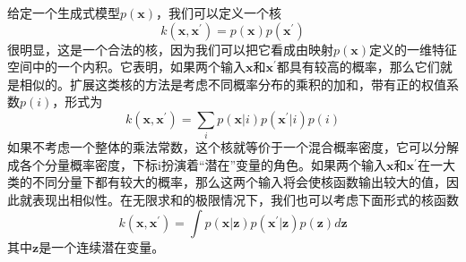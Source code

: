 给定一个生成式模型$p(\boldsymbol{x})$，我们可以定义一个核
\begin{equation}
	k(\boldsymbol{x},\boldsymbol{x}^{'})=p(\boldsymbol{x})p(\boldsymbol{x}^{'})
\end{equation}
很明显，这是一个合法的核，因为我们可以把它看成由映射$p(\boldsymbol{x})$定义的一维特征空间中的一个内积。它表明，如果两个输入$\boldsymbol{x}$和$\boldsymbol{x}^{'}$都具有较高的概率，那么它们就是相似的。扩展这类核的方法是考虑不同概率分布的乘积的加和，带有正的权值系数$p(i)$，形式为
\begin{equation}
	k(\boldsymbol{x},\boldsymbol{x}^{'})=\sum_ip(\boldsymbol{x}|i)p(\boldsymbol{x}^{'}|i)p(i)
\end{equation}
如果不考虑一个整体的乘法常数，这个核就等价于一个混合概率密度，它可以分解成各个分量概率密度，下标i扮演着“潜在”变量的角色。如果两个输入$\boldsymbol{x}$和$\boldsymbol{x}^{'}$在一大类的不同分量下都有较大的概率，那么这两个输入将会使核函数输出较大的值，因此就表现出相似性。在无限求和的极限情况下，我们也可以考虑下面形式的核函数 
\begin{equation}
		k(\boldsymbol{x},\boldsymbol{x}^{'})=\int p(\boldsymbol{x}|\boldsymbol{z})p(\boldsymbol{x}^{'}|\boldsymbol{z})p(\boldsymbol{z})d\boldsymbol{z}
\end{equation}
其中$\boldsymbol{z}$是一个连续潜在变量。
